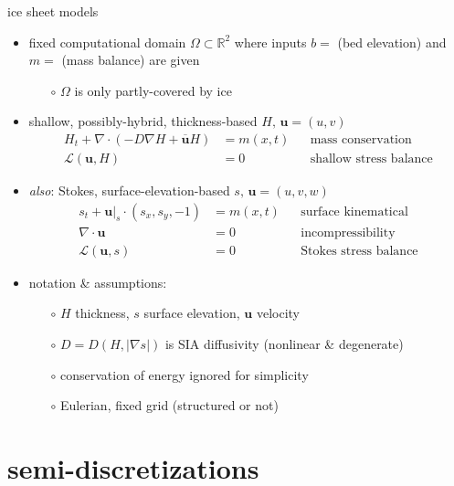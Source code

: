 \documentclass[hide notes,intlimits,usenames,dvipsnames]{beamer}
\newcommand{\RR}{\mathbb{R}}
\newcommand{\Div}{\nabla\cdot}
\newcommand{\grad}{\nabla}
\renewcommand{\bar}{\overline}
\begin{document}
\begin{frame}{ice sheet models}

\begin{itemize}
\item fixed computational domain $\Omega\subset \RR^2$ where inputs $b=$ (bed elevation) and $m=$ (mass balance) are given
    \begin{itemize}
    \item[$\circ$] \alert{$\Omega$ is only partly-covered by ice}
    \end{itemize}
\item shallow, possibly-hybrid, thickness-based \hfill {\scriptsize\color{Gray} $H,\, \mathbf{u}=(u,v)$}
        \begin{align*}
        H_t + \Div (-D \grad H + \bar{\mathbf{u}} H) &= m(x,t) && \text{mass conservation} \\
        \mathcal{L}(\mathbf{u},H) &= 0      && \text{shallow stress balance}
        \end{align*}
\item \emph{also}: Stokes, surface-elevation-based \hfill {\scriptsize\color{Gray} $s,\, \mathbf{u}=(u,v,w)$}
        \begin{align*}
        s_t + \mathbf{u}\big|_s \cdot (s_x,s_y,-1) &= m(x,t) && \text{surface kinematical} \\
        \Div \mathbf{u} &= 0            && \text{incompressibility} \\
        \mathcal{L}(\mathbf{u},s) &= 0  && \text{Stokes stress balance}
        \end{align*}
\item notation \& assumptions:
    \begin{itemize}
    \item[$\circ$] $H$ thickness, $s$ surface elevation, $\mathbf{u}$ velocity
    \item[$\circ$] $D=D(H,|\grad s|)$ is SIA diffusivity (nonlinear \& degenerate)
    \item[$\circ$] conservation of energy ignored for simplicity
    \item[$\circ$] Eulerian, fixed grid (structured or not)
    \end{itemize}
\end{itemize}
\end{frame}


\section{semi-discretizations}
\end{document}
